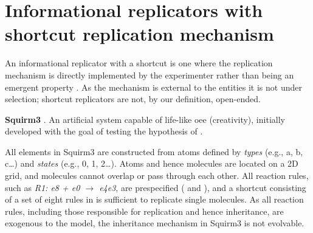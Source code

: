 \section{Informational replicators with shortcut replication mechanism}

An informational replicator with a shortcut is one where the replication mechanism is directly implemented by the experimenter rather than being an emergent property \parencite{BanzhafBaumgaertnerBeslonEtAl2016}. As the mechanism is external to the entities it is not under selection; shortcut replicators are not, by our definition, open-ended.

\begin{NOTES}


\end{NOTES}
\textbf{Squirm3} \parencite{Hutton2007,Hutton2002}. An artificial system capable of life-like \gls{oee} (creativity), initially developed with the goal of testing the hypothesis of \textcite{Taylor2001} \parencite[p.341]{Hutton2002}.

All elements in Squirm3 are constructed from atoms defined by \emph{types} (e.g., a, b, c\dots) and \emph{states} (e.g., 0, 1, 2\dots). Atoms and hence molecules are located on a 2D grid, and molecules cannot overlap or pass through each other. All reaction rules, such as \emph{R1: e8 + e0 $\rightarrow$ e4e3}, are prespecified (\cite[p.4]{Hutton2007} and \cite[p.49]{Faulconbridge2011}), and a shortcut consisting of a set of eight rules in \cite{Hutton2002} is sufficient to replicate single molecules. As all reaction rules, including those responsible for replication and hence inheritance, are exogenous to the model, the inheritance mechanism in Squirm3 is not evolvable. 

